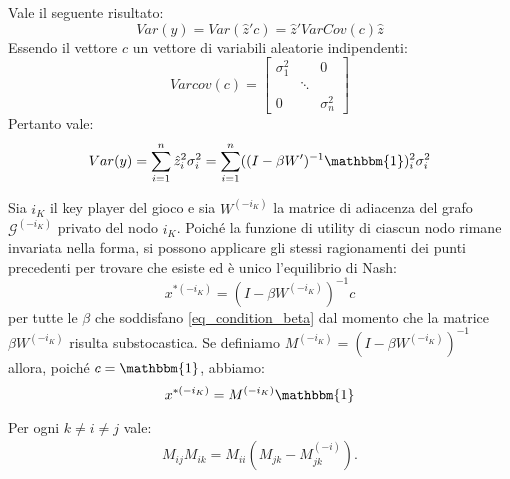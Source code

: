 \begin{alphaparts}
    \questionpart
    Vale il seguente risultato:
    \[
    Var(y) = Var(\hat{z}'c) = \hat{z}'VarCov(c)\hat{z}    
    \]
    Essendo il vettore \(c\) un vettore di variabili aleatorie indipendenti:
    \[
    Varcov(c) = \begin{bmatrix}
        \sigma_1^2 & & 0 \\
         & \ddots & \\
         0 & & \sigma_n^2
    \end{bmatrix}    
    \]
    Pertanto vale:
    \[Var(y) =  \sum \limits_{i = 1}^{n} \hat{z}_i^2 \sigma_i^2 =  \sum \limits_{i = 1}^{n} ((I - \beta W')^{-1}\mathbbm{1})_i^2 \sigma_i^2\]

    \questionpart
    Sia \(i_K\) il key player del gioco e sia \(W^{(- i_K)}\) la matrice di adiacenza del grafo \(\mathcal{G}^{(- i_K)}\) privato del nodo \(i_K\). Poiché la funzione di utility di ciascun nodo rimane invariata nella forma, si possono applicare gli stessi ragionamenti dei punti precedenti per trovare che esiste ed è unico l'equilibrio di Nash:
    \[
    x^{*(- i_K)} = (I- \beta W^{(- i_K)})^{- 1}c  
    \]
    per tutte le \(\beta\) che soddisfano \eqref{eq_condition_beta} dal momento che la matrice \(\beta W^{(- i_K)}\) risulta substocastica. Se definiamo \(M^{(- i_K)} = (I- \beta W^{(- i_K)})^{- 1}\) allora, poiché \(c= \mathbbm{1}\), abbiamo: 
    \begin{equation}    
            x^{*(- i_K)} = M^{(- i_K)} \mathbbm{1}
    \end{equation}
    
    \questionpart
    Per ogni \(k \neq i \neq j\) vale:
    \begin{gather*}
        M_{ij}M_{ik} = M_{ii}(M_{jk}-M_{jk}^{(-i)}).
    \end{gather*}


\end{alphaparts}
